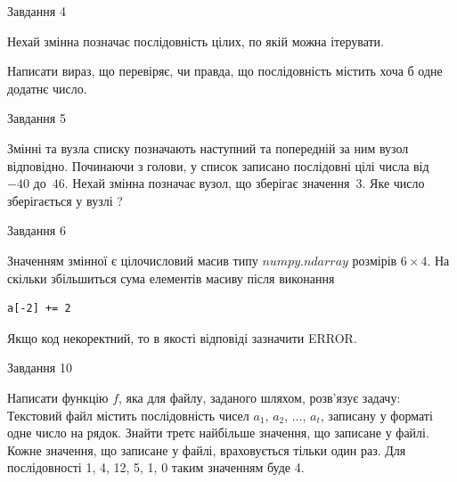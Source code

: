 \documentclass[12pt, ukrainian]{article}
\begin{document}
{\begin{minipage}[t]{8.0cm}
\end{minipage}


               
{\begin{center}Завдання {4}\end{center}}
\vspace{-4mm}
Нехай змінна  позначає послідовність цілих, по якій можна ітерувати.

Написати вираз, що перевіряє, чи правда, що послідовність  містить хоча б одне додатнє число.\par

\vspace{10mm}
               
{\begin{center}Завдання {5}\end{center}}
\vspace{-4mm}
Змінні  та  вузла списку позначають наступний та попередній за ним вузол відповідно. Починаючи з голови, у список записано послідовні цілі числа від~$-40$ до~$46$. Нехай змінна  позначає вузол, що зберігає значення~$3$.
Яке число зберігається у вузлі  ?\par

               
{\begin{center}Завдання {6}\end{center}}
\vspace{-4mm}
Значенням змінної  є цілочисловий масив типу $numpy.ndarray$ розмірів $6{\times}4$. На скільки збільшиться сума елементів масиву  після виконання
\begin{verbatim}
a[-2] += 2
\end{verbatim}


Якщо код некоректний, то в якості відповіді зазначити ERROR.\par

               
{\begin{center}Завдання {10}\end{center}}
\vspace{-4mm}

Написати функцію $f$, яка для файлу, заданого шляхом, розв’язує задачу:\\ Текстовий файл містить послідовність чисел $a_1$, $a_2$, $\ldots$, $a_t$, записану у форматі одне число на рядок. Знайти третє найбільше значення, що записане у файлі. Кожне значення, що записане у файлі, враховується тільки один раз. Для послідовності 1, 4, 12, 5, 1, 0 таким значенням буде 4.

}
\end{document}
